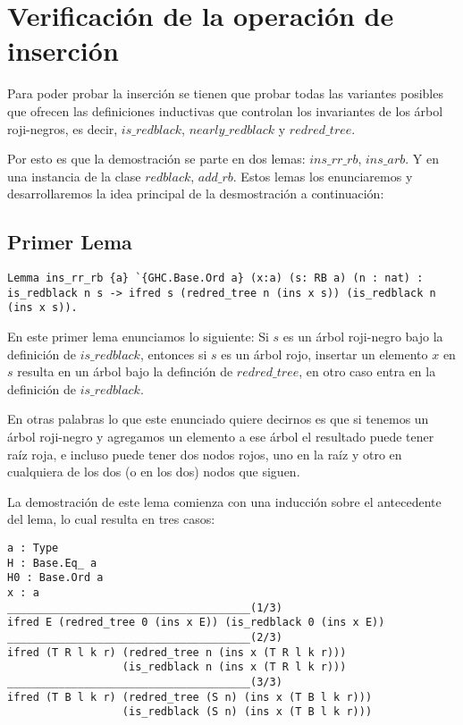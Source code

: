 \documentclass[letterpaper,12pt,oneside]{book}
\newcommand{\arn}{árbol roji-negro}
\theoremstyle{plain}
\theoremstyle{definition}
\theoremstyle{remark}
\begin{document}
\section{Verificación de la operación de inserción}

Para poder probar la inserci\'on se tienen que probar todas las variantes posibles que ofrecen las definiciones inductivas
que controlan los invariantes de los {{{{\arn}}}s}, es decir, $is\_redblack$, $nearly\_redblack$ y $redred\_tree$.

Por esto es que la demostraci\'on se parte en dos lemas: $ins\_rr\_rb$, $ins\_arb$. Y en una instancia\cite{classes} de la clase $redblack$, $add\_rb$. Estos lemas los enunciaremos
y desarrollaremos la idea principal de la desmostraci\'on a continuaci\'on:

\subsection{Primer Lema}

\begin{verbatim}
Lemma ins_rr_rb {a} `{GHC.Base.Ord a} (x:a) (s: RB a) (n : nat) :
is_redblack n s -> ifred s (redred_tree n (ins x s)) (is_redblack n (ins x s)).
\end{verbatim}
 En este primer lema enunciamos lo siguiente: Si $s$ es un {{{\arn}}} bajo la definici\'on de $is\_redblack$, entonces 
 si $s$ es un \'arbol rojo, insertar un elemento $x$ en $s$ resulta en un \'arbol bajo la definci\'on de 
 $redred\_tree$, en otro caso entra en la definici\'on de $is\_redblack$.

 En otras palabras lo que este enunciado quiere decirnos es que si tenemos un {{{\arn}}} y agregamos un elemento a ese \'arbol
 el resultado puede tener ra\'iz roja, e incluso puede tener dos nodos rojos, uno en la ra\'iz y otro en cualquiera de los dos
 (o en los dos) nodos que siguen.

 La demostraci\'on de este lema comienza con una inducci\'on sobre el antecedente del lema, lo cual resulta en tres casos:
 \begin{verbatim}
a : Type
H : Base.Eq_ a
H0 : Base.Ord a
x : a
______________________________________(1/3)
ifred E (redred_tree 0 (ins x E)) (is_redblack 0 (ins x E))
______________________________________(2/3)
ifred (T R l k r) (redred_tree n (ins x (T R l k r))) 
                  (is_redblack n (ins x (T R l k r)))
______________________________________(3/3)
ifred (T B l k r) (redred_tree (S n) (ins x (T B l k r)))
                  (is_redblack (S n) (ins x (T B l k r)))
 \end{verbatim}
\end{document}
